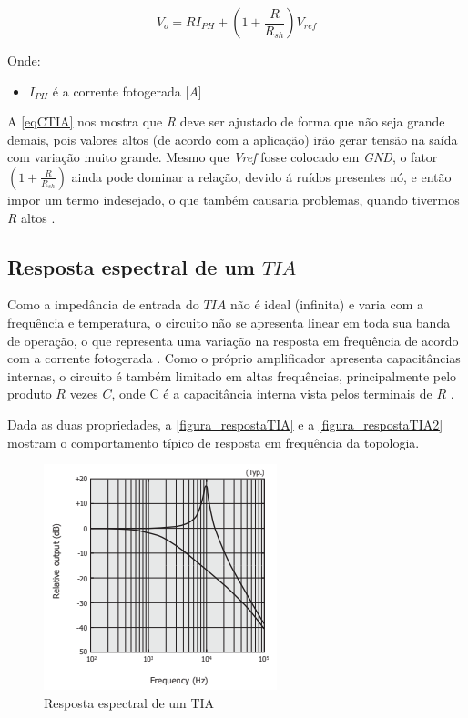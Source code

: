 \begin{equation}
    \label{eqCTIA}
    V_o = RI_{PH} + (1+\frac{R}{R_{sh}})V_{ref}
\end{equation}

Onde:
\begin{itemize}
    \item $I_{PH}$ \'e a corrente fotogerada [$A$]
\end{itemize}

A \autoref{eqCTIA} nos mostra que \emph{R} deve ser ajustado de forma que n\~ao seja grande demais, pois valores altos (de acordo com a aplicação) irão gerar tens\~ao na sa\'ida com varia{\c c}\~ao muito grande. Mesmo que \emph{Vref} fosse colocado em \emph{GND}, o fator $(1+\frac{R}{R_{sh}})$ ainda pode dominar a relação, devido \'a ruídos presentes nó, e então impor um termo indesejado, o que também causaria problemas, quando tivermos \emph{R} altos \cite{hamamatsu}.

\subsection{Resposta espectral de um $TIA$}

Como a imped\^ancia de entrada do $TIA$ n\~ao \'e ideal (infinita) e varia com a frequ\^encia e temperatura, o circuito n\~ao se apresenta linear em toda sua banda de opera{\c c}\~ao, o que representa uma varia{\c c}\~ao na resposta em frequ\^encia de acordo com a corrente fotogerada \cite{hamamatsu}.
Como o pr\'oprio amplificador apresenta capacit\^ancias internas, o circuito \'e tamb\'em limitado em altas frequ\^encias, principalmente pelo produto $R$ vezes $C$, onde C \'e a capacit\^ancia interna vista pelos terminais de $R$ \cite{hamamatsu}.

Dada as duas propriedades, a \autoref{figura_respostaTIA} e a \autoref{figura_respostaTIA2} mostram o comportamento t\'ipico de resposta em frequ\^encia da topologia.

\begin{figure}[htb]
	\caption{\label{figura_respostaTIA}Resposta espectral de um TIA}
	\begin{center}
	    \includegraphics[scale=1]{Imagens/RespostaEspectralTIA.png}
	\end{center}
\end{figure}


